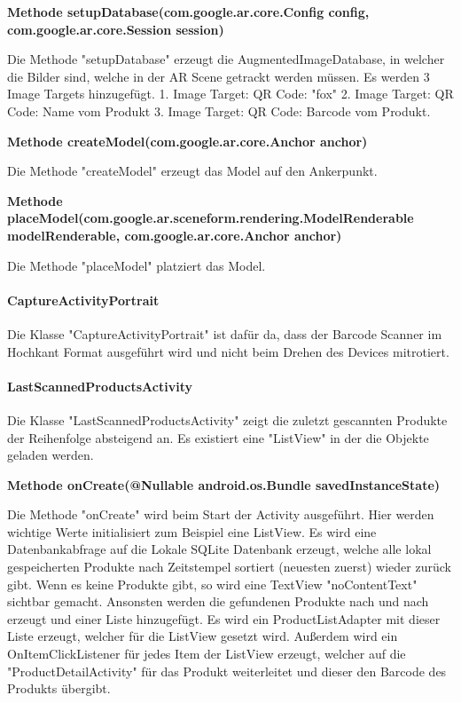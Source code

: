 \documentclass{scrartcl}
\begin{document}
\noindent\textbf{Methode setupDatabase(com.google.ar.core.Config config, \newline com.google.ar.core.Session session)}

\noindent Die Methode "setupDatabase" erzeugt die AugmentedImageDatabase, in welcher die Bilder sind, welche in der AR Scene getrackt werden müssen. Es werden 3 Image Targets hinzugefügt. 1. Image Target: QR Code: "fox" 2. Image Target: QR Code: Name vom Produkt 3. Image Target: QR Code: Barcode vom Produkt. \newline

\noindent\textbf{Methode createModel(com.google.ar.core.Anchor anchor)}

\noindent Die Methode "createModel" erzeugt das Model auf den Ankerpunkt. \newline

\noindent\textbf{Methode 	placeModel(com.google.ar.sceneform.rendering.ModelRenderable \newline modelRenderable, com.google.ar.core.Anchor anchor)}

\noindent Die Methode "placeModel" platziert das Model. \newline



\paragraph{CaptureActivityPortrait}

Die Klasse "CaptureActivityPortrait" ist dafür da, dass der Barcode Scanner im Hochkant Format ausgeführt wird und nicht beim Drehen des Devices mitrotiert. \newline 


\paragraph{LastScannedProductsActivity}

Die Klasse "LastScannedProductsActivity" zeigt die zuletzt gescannten Produkte der Reihenfolge absteigend an. Es existiert eine "ListView" in der die Objekte geladen werden. \newline

\noindent\textbf{Methode onCreate(@Nullable android.os.Bundle savedInstanceState)}

\noindent Die Methode "onCreate" wird beim Start der Activity ausgeführt. Hier werden wichtige Werte initialisiert zum Beispiel eine ListView. Es wird eine Datenbankabfrage auf die Lokale SQLite Datenbank erzeugt, welche alle lokal gespeicherten Produkte nach Zeitstempel sortiert (neuesten zuerst) wieder zurück gibt. Wenn es keine Produkte gibt, so wird eine TextView "noContentText" sichtbar gemacht. Ansonsten werden die gefundenen Produkte nach und nach erzeugt und einer Liste hinzugefügt. Es wird ein ProductListAdapter mit dieser Liste erzeugt, welcher für die ListView gesetzt wird. Außerdem wird ein OnItemClickListener für jedes Item der ListView erzeugt, welcher auf die "ProductDetailActivity" für das Produkt weiterleitet und dieser den Barcode des Produkts übergibt. \newline
\end{document}
